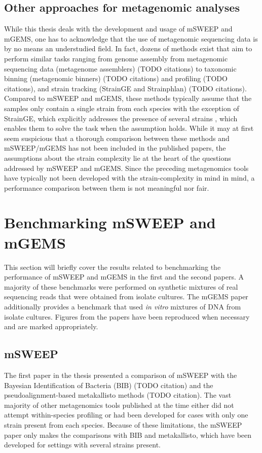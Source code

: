 \documentclass[officiallayout]{tktla}
\begin{document}
\subsection{Other approaches for metagenomic analyses}
\label{other-metagenomics-approaches}
While this thesis deals with the development and usage of mSWEEP and
mGEMS, one has to acknowledge that the use of metagenomic sequencing
data is by no means an understudied field. In fact, dozens of methods
exist that aim to perform similar tasks ranging from genome assembly
from metagenomic sequencing data (metagenome assemblers) (TODO
citations) to taxonomic binning (metagenomic binners) (TODO citations)
and profiling (TODO citations), and strain tracking (StrainGE and
Strainphlan) (TODO citations). Compared to mSWEEP and mGEMS, these
methods typically assume that the samples only contain a single strain
from each species \textemdash{ } with the exception of StrainGE, which
explicitly addresses the presence of several strains \textemdash{ },
which enables them to solve the task when the assumption holds. While
it may at first seem suspicious that a thorough comparison between
these methods and mSWEEP/mGEMS has not been included in the published
papers, the assumptions about the strain complexity lie at the heart
of the questions addressed by mSWEEP and mGEMS. Since the preceding
metagenomics tools have typically not been developed with the
strain-complexity in mind in mind, a performance comparison between
them is not meaningful nor fair.

\section{Benchmarking mSWEEP and mGEMS}

This section will briefly cover the results related to benchmarking
the performance of mSWEEP and mGEMS in the first and the second
papers. A majority of these benchmarks were performed on synthetic
mixtures of real sequencing reads that were obtained from isolate
cultures. The mGEMS paper additionally provides a benchmark that used
\textit{in vitro} mixtures of DNA from isolate cultures. Figures from
the papers have been reproduced when necessary and are marked
appropriately.

\subsection{mSWEEP}
The first paper in the thesis presented a comparison of mSWEEP with
the Bayesian Identification of Bacteria (BIB) (TODO citation) and the
pseudoalignment-based metakallisto methods (TODO citation). The vast
majority of other metagenomics tools published at the time either did
not attempt within-species profiling or had been developed for cases
with only one strain present from each species. Because of these
limitations, the mSWEEP paper only makes the comparisons with BIB and
metakallisto, which have been developed for settings with several
strains present.
\end{document}
